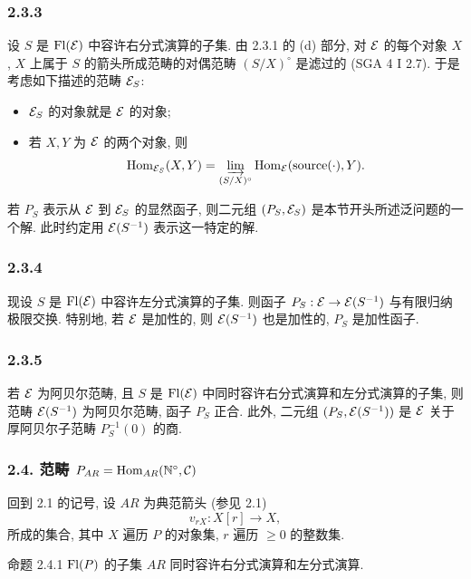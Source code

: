 \subsubsection*{2.3.3}
设 $S$ 是 $\operatorname{Fl}(\mathcal E)$ 中容许右分式演算的子集. 由 2.3.1 的 (d) 部分, 对 $\mathcal E$ 的每个对象 $X$, $X$ 上属于 $S$ 的箭头所成范畴的对偶范畴 $(S/X)^\circ$ 是滤过的 (SGA 4 I 2.7). 于是考虑如下描述的范畴 $\mathcal E_S$:
\begin{itemize}
\item $\mathcal E_S$ 的对象就是 $\mathcal E$ 的对象;
\item 若 $X,Y$ 为 $\mathcal E$ 的两个对象, 则
\[
\operatorname{Hom}_{\mathcal E_S}(X,Y)=\varinjlim_{(S/X)^\circ}\operatorname{Hom}_{\mathcal E}(\operatorname{source}(\cdot),Y).
\]
\end{itemize}
若 $P_S$ 表示从 $\mathcal E$ 到 $\mathcal E_S$ 的显然函子, 则二元组 $(P_S,\mathcal E_S)$ 是本节开头所述泛问题的一个解. 此时约定用 $\mathcal E(S^{-1})$ 表示这一特定的解.

\subsubsection*{2.3.4}
现设 $S$ 是 $\operatorname{Fl}(\mathcal E)$ 中容许左分式演算的子集. 则函子 $P_S:\mathcal E\to\mathcal E(S^{-1})$ 与有限归纳极限交换. 特别地, 若 $\mathcal E$ 是加性的, 则 $\mathcal E(S^{-1})$ 也是加性的, $P_S$ 是加性函子.

\subsubsection*{2.3.5}
若 $\mathcal E$ 为阿贝尔范畴, 且 $S$ 是 $\operatorname{Fl}(\mathcal E)$ 中同时容许右分式演算和左分式演算的子集, 则范畴 $\mathcal E(S^{-1})$ 为阿贝尔范畴, 函子 $P_S$ 正合. 此外, 二元组 $(P_S,\mathcal E(S^{-1}))$ 是 $\mathcal E$ 关于厚阿贝尔子范畴 $P_S^{-1}(0)$ 的商.

\subsubsection*{2.4. 范畴 $P_{AR}=\operatorname{Hom}_{AR}(\mathbb N^\circ,\mathcal C)$}
回到 2.1 的记号, 设 $AR$ 为典范箭头 (参见 2.1)
\[
v_{rX}:X[r]\longrightarrow X,
\]
所成的集合, 其中 $X$ 遍历 $P$ 的对象集, $r$ 遍历 $\ge0$ 的整数集.

\begin{statement}{命题 2.4.1}
$\operatorname{Fl}(P)$ 的子集 $AR$ 同时容许右分式演算和左分式演算.
\end{statement}


